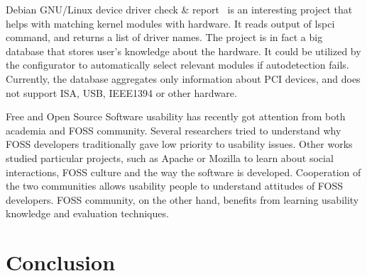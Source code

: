 \documentclass{chi2009}
\begin{document}
Debian GNU/Linux device driver check \& report~\cite{muto:check:2010} is an interesting project that helps with matching kernel modules with hardware. It reads output of \textsf{lspci} command, and returns a list of driver names. The project is in fact a big database that stores user's knowledge about the hardware. It could be utilized by the configurator to automatically select relevant modules if autodetection fails. Currently, the database aggregates only information about PCI devices, and does not support ISA, USB, IEEE1394 or other hardware.

Free and Open Source Software usability has recently got attention from both academia and FOSS community. Several researchers \cite{nichols:usability:2003,andreasen:usability:2006} tried to understand why FOSS developers traditionally gave low priority to usability issues. Other works studied particular projects, such as Apache \cite{mockus:apache:2000} or Mozilla \cite{mockus:mozilla:2002} to learn about social interactions, FOSS culture and the way the software is developed. Cooperation of the two communities allows usability people to understand attitudes of FOSS developers. FOSS community, on the other hand, benefits from learning  usability knowledge and evaluation techniques.

\section{Conclusion}\label{sec:conclusion}



\end{document}
